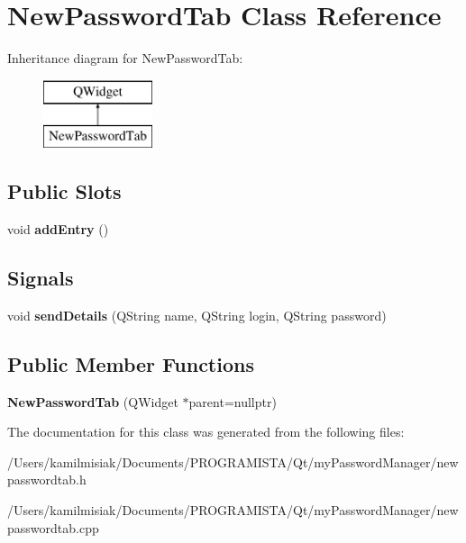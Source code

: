 \hypertarget{class_new_password_tab}{}\section{New\+Password\+Tab Class Reference}
\label{class_new_password_tab}
Inheritance diagram for New\+Password\+Tab\+:\begin{figure}[H]
\begin{center}
\leavevmode
\includegraphics[height=2.000000cm]{class_new_password_tab}
\end{center}
\end{figure}
\subsection*{Public Slots}
\begin{DoxyCompactItemize}
\item 
\mbox{\label{class_new_password_tab_ac5381fb3ff8c177a2d690d0e2541f832}} 
void {\bfseries add\+Entry} ()
\end{DoxyCompactItemize}
\subsection*{Signals}
\begin{DoxyCompactItemize}
\item 
\mbox{\label{class_new_password_tab_af4a738b36f6b5e9671e30924210ee99b}} 
void {\bfseries send\+Details} (Q\+String name, Q\+String login, Q\+String password)
\end{DoxyCompactItemize}
\subsection*{Public Member Functions}
\begin{DoxyCompactItemize}
\item 
\mbox{\label{class_new_password_tab_acabbe01bcd774bfb1c703f279c006be8}} 
{\bfseries New\+Password\+Tab} (Q\+Widget $\ast$parent=nullptr)
\end{DoxyCompactItemize}


The documentation for this class was generated from the following files\+:\begin{DoxyCompactItemize}
\item 
/\+Users/kamilmisiak/\+Documents/\+P\+R\+O\+G\+R\+A\+M\+I\+S\+T\+A/\+Qt/my\+Password\+Manager/newpasswordtab.\+h\item 
/\+Users/kamilmisiak/\+Documents/\+P\+R\+O\+G\+R\+A\+M\+I\+S\+T\+A/\+Qt/my\+Password\+Manager/newpasswordtab.\+cpp\end{DoxyCompactItemize}
